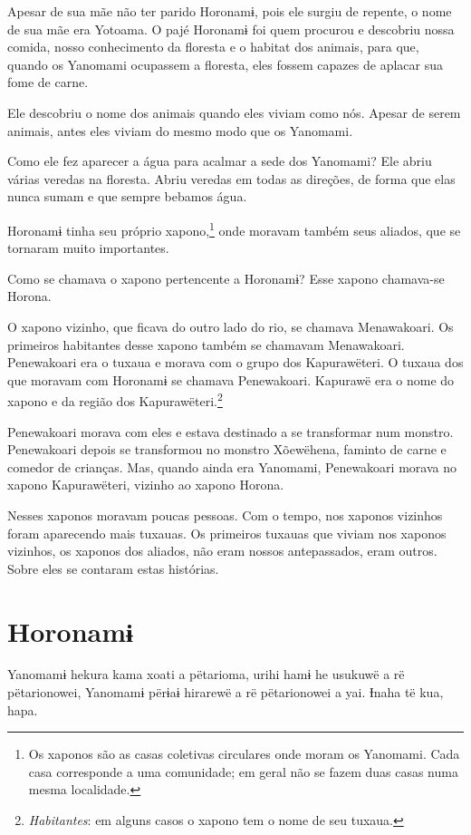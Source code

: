 Apesar de sua mãe não ter parido Horonamɨ, pois ele surgiu de repente, o
nome de sua mãe era Yotoama. O pajé Horonamɨ foi quem procurou e
descobriu nossa comida, nosso conhecimento da floresta e o habitat dos
animais, para que, quando os Yanomami ocupassem a floresta, eles fossem
capazes de aplacar sua fome de carne. 

Ele descobriu o nome dos animais quando eles viviam como nós. Apesar de
serem animais, antes eles viviam do mesmo modo que os Yanomami. 

Como ele fez aparecer a água para acalmar a sede dos Yanomami? Ele abriu
várias veredas na floresta. Abriu veredas em todas as direções, de forma
que elas nunca sumam e que sempre bebamos água. 

Horonamɨ tinha seu próprio xapono,\footnote{Os xaponos são as casas 
coletivas circulares onde moram os Yanomami. Cada casa corresponde 
a uma comunidade; em geral não se fazem duas casas numa mesma localidade.} onde moravam
também seus aliados, que se tornaram muito importantes. 

Como se chamava o xapono pertencente a Horonamɨ? Esse xapono chamava-se
Horona. 

O xapono vizinho, que ficava do outro lado do rio, se chamava
Menawakoari. Os primeiros habitantes desse xapono também se
chamavam Menawakoari. Penewakoari era o tuxaua e morava com o grupo dos
Kapurawëteri. O tuxaua dos que moravam com Horonamɨ se chamava
Penewakoari. Kapurawë era o nome do xapono e da região dos
Kapurawëteri.\footnote{\textit{Habitantes}: em alguns casos o xapono tem o nome de seu tuxaua.}

Penewakoari morava com eles e estava destinado a se transformar num
monstro. Penewakoari depois se transformou no monstro Xõewëhena, faminto
de carne e comedor de crianças. Mas, quando ainda era Yanomami,
Penewakoari morava no xapono Kapurawëteri, vizinho ao
xapono Horona.

Nesses xaponos moravam poucas pessoas. Com o tempo, nos xaponos vizinhos
foram aparecendo mais tuxauas. Os primeiros tuxauas que viviam nos
xaponos vizinhos, os xaponos dos aliados, não eram nossos
antepassados, eram outros. Sobre eles se contaram estas histórias.

\chapter{Horonamɨ}

Yanomamɨ hekura kama xoati a pëtarioma, urihi hamɨ he usukuwë a rë
pëtarionowei, Yanomamɨ përɨaɨ hirarewë a rë pëtarionowei a yai. Ɨnaha të
kua, hapa. 

